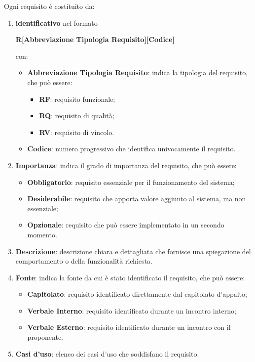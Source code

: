 Ogni requisito è costituito da:
\begin{enumerate}
	\item \textbf{identificativo} nel formato \begin{center}\textbf{R[Abbreviazione Tipologia Requisito][Codice]}\end{center} con:\\
	\begin{itemize}
		\item \textbf{Abbreviazione Tipologia Requisito}: indica la tipologia del requisito, che può essere:
		\begin{itemize}
			\item \textbf{RF}: requisito funzionale;
			\item \textbf{RQ}: requisito di qualità;
			\item \textbf{RV}: requisito di vincolo.
		\end{itemize}
		\item \textbf{Codice}: numero progressivo che identifica univocamente il requisito.
	\end{itemize}
	\item \textbf{Importanza}: indica il grado di importanza del requisito, che può essere:
	\begin{itemize}
		\item \textbf{Obbligatorio}: requisito essenziale per il funzionamento del sistema;
		\item \textbf{Desiderabile}: requisito che apporta valore aggiunto al sistema, ma non essenziale;
		\item \textbf{Opzionale}: requisito che può essere implementato in un secondo momento.
	\end{itemize}
	\item \textbf{Descrizione}: descrizione chiara e dettagliata che fornisce una spiegazione del comportamento o della funzionalità richiesta.
	\item \textbf{Fonte}: indica la fonte da cui è stato identificato il requisito, che può essere:\\
	\begin{itemize}
		\item \textbf{Capitolato}: requisito identificato direttamente dal capitolato d'appalto;
		\item \textbf{Verbale Interno}: requisito identificato durante un incontro interno;
		\item \textbf{Verbale Esterno}: requisito identificato durante un incontro con il proponente.
	\end{itemize}
	\item \textbf{Casi d'uso}: elenco dei casi d'uso che soddisfano il requisito.
\end{enumerate}


